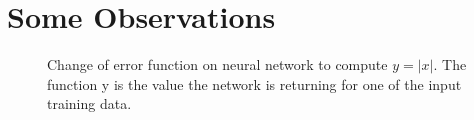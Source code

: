 \documentclass[a4paper,12pt]{article}
\theoremstyle{mytheoremstyle}
\theoremstyle{mytheoremstyle}
\theoremstyle{myproblemstyle}
\begin{document}
    \section{Some Observations}

    \begin{wrapfigure}{O}{0.5\textwidth}
        \begin{center}
            
        \end{center}
        \caption{Change of error function on neural network to compute $ y =
        \left| x \right| $. The function y is the value the network is
        returning for one of the input training data.}\label{fig:abs}
    \end{wrapfigure}
    \medskip
\end{document}
